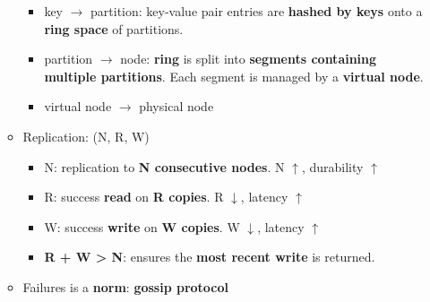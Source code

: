 \begin{itemize}
\begin{itemize}
\begin{itemize}
			\item key $\rightarrow$ partition: key-value pair entries are \textbf{hashed by keys} onto a \textbf{ring space} of partitions.
			\item partition $\rightarrow$ node: \textbf{ring} is split into \textbf{segments containing multiple partitions}. Each segment is managed by a \textbf{virtual node}.
			\item virtual node $\rightarrow$ physical node
		\end{itemize}
		\item Replication: (N, R, W)
		\begin{itemize}
			\item N: replication to \textbf{N consecutive nodes}. N $\uparrow$, durability $\uparrow$
			\item R: success \textbf{read} on \textbf{R copies}. R $\downarrow$, latency $\uparrow$
			\item W: success \textbf{write} on \textbf{W copies}. W $\downarrow$, latency $\uparrow$
			\item \textbf{R + W > N}: ensures the \textbf{most recent write} is returned.
		\end{itemize}
		
		\item Failures is a \textbf{norm}: \textbf{gossip protocol}
		

	\end{itemize} 
\end{itemize}

